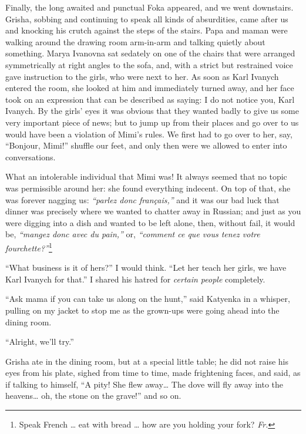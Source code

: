 Finally, the long awaited and punctual Foka appeared, and we went downstairs. Grisha, sobbing and continuing to speak all kinds of absurdities, came after us and knocking his crutch against the steps of the stairs. Papa and maman were walking around the drawing room arm-in-arm and talking quietly about something. Marya Ivanovna sat sedately on one of the chairs that were arranged symmetrically at right angles to the sofa, and, with a strict but restrained voice gave instruction to the girls, who were next to her.  As soon as Karl Ivanych entered the room, she looked at him and immediately turned away, and her face took on an expression that can be described as saying: I do not notice you, Karl Ivanych. By the girls' eyes it was obvious that they wanted badly to give us some very important piece of news; but to jump up from their places and go over to us would have been a violation of Mimi's rules. We first had to go over to her, say, ``Bonjour, Mimi!''  shuffle our feet, and only then were we allowed to enter into conversations.

What an intolerable individual that Mimi was! It always seemed that no topic was permissible around her: she found everything indecent. On top of that, she was forever nagging us: \textit{``parlez donc fran\c cais,''} and it was our bad luck that dinner was precisely where we wanted to chatter away in Russian; and just as you were digging into a dish and wanted to be left alone, then, without fail, it would be, \textit{``mangez donc avec du pain,''} or, \textit{``comment ce que vous tenez votre fourchette?''}\footnote{Speak French \ldots{} eat with bread \ldots{} how are you holding your fork? \textit{Fr.}}  %

``What business is it of hers?'' I would think. ``Let her teach her girls, we have Karl Ivanych for that.'' I shared his hatred for \emph{certain people} completely.

``Ask mama if you can take us along on the hunt,'' said Katyenka in a whisper, pulling on my jacket to stop me as the grown-ups were going ahead into the dining room. %

``Alright, we'll try.'' %

Grisha ate in the dining room, but at a special little table; he did not raise his eyes from his plate, sighed from time to time, made frightening faces, and said, as if talking to himself, ``A pity! She flew away\ldots{} The dove will fly away into the heavens\ldots{} oh, the stone on the grave!'' and so on. %

